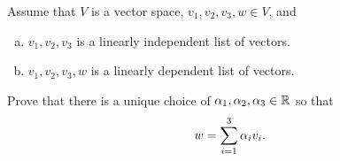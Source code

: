 \begin{question}
    \normalfont

    Assume that $V$ is a vector space, $v_1,v_2,v_3,w\in V$, and
    \begin{enumerate}[(a)]
        \item $v_1,v_2,v_3$ \hspace{.1cm} is a linearly independent list of vectors.
        \item $v_1,v_2,v_3,w$ \hspace{.1cm}  is a linearly dependent list of vectors.
    \end{enumerate}
    Prove that there is a unique choice of $\alpha_1,\alpha_2,\alpha_3\in{\mathbb R}$ so that
    \begin{align*}
        w=\sum_{i=1}^3 \alpha_iv_i.
    \end{align*}
\end{question}